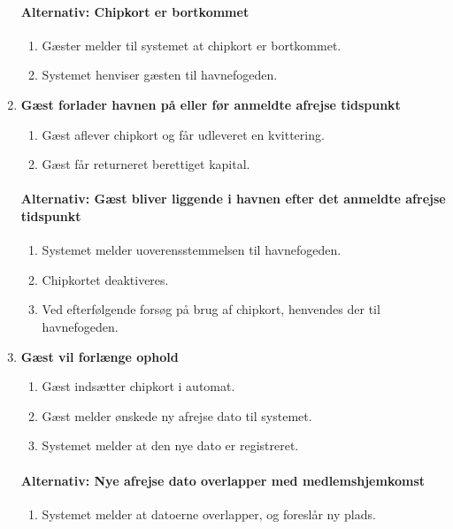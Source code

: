 \begin{enumerate}
    \paragraph{Alternativ: Chipkort er bortkommet}
      \begin{enumerate}
        \item Gæster melder til systemet at chipkort er bortkommet.
        \item Systemet henviser gæsten til havnefogeden.
      \end{enumerate}


    \item{\bf{Gæst forlader havnen på eller før anmeldte afrejse tidspunkt}}
      \begin{enumerate}
        \item Gæst aflever chipkort og får udleveret en kvittering.
        \item Gæst får returneret berettiget kapital.
      \end{enumerate}

    \paragraph{Alternativ: Gæst bliver liggende i havnen efter det anmeldte afrejse tidspunkt}
      \begin{enumerate}
        \item Systemet melder uoverensstemmelsen til havnefogeden.
        \item Chipkortet deaktiveres.
        \item Ved efterfølgende forsøg på brug af chipkort, henvendes der til havnefogeden.
      \end{enumerate}


    \item{\bf{Gæst vil forlænge ophold}}
      \begin{enumerate}
        \item Gæst indsætter chipkort i automat.
        \item Gæst melder ønskede ny afrejse dato til systemet.
        \item Systemet melder at den nye dato er registreret.
      \end{enumerate}

    \paragraph{Alternativ: Nye afrejse dato overlapper med medlemshjemkomst}
      \begin{enumerate}
        \item Systemet melder at datoerne overlapper, og foreslår ny plads.
      \end{enumerate}


\end{enumerate}
